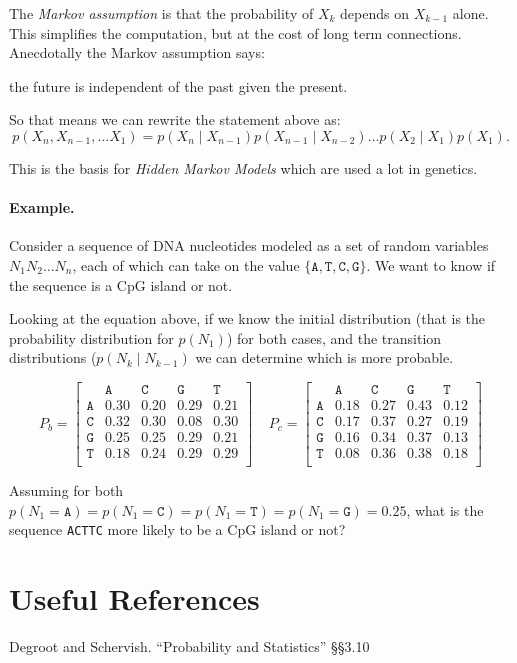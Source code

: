 The \emph{Markov assumption} is that the probability of $X_k$ depends on $X_{k-1}$ alone. 
This simplifies the computation, but at the cost of long term connections. 
Anecdotally the Markov assumption says: 
\begin{center}
the future is independent of the past given the present. 
\end{center}
So that means we can rewrite the statement above as: 
\[p(X_n,X_{n-1},...X_1) = p(X_n \mid X_{n-1}) p(X_{n-1} \mid X_{n-2}) \hdots p(X_2 \mid X_1) p(X_1).\]

This is the basis for \emph{Hidden Markov Models} which are used a lot in genetics. 

\paragraph{Example.} 
Consider a sequence of DNA nucleotides modeled as a set of random variables $N_1N_2\hdots N_n$,
each of which can take on the value $\{\texttt{A},\texttt{T},\texttt{C},\texttt{G}\}$. 
We want to know if the sequence is a CpG island or not. 

Looking at the equation above, if we know the initial distribution (that is the probability distribution for $p(N_1)$) for both cases,
and the transition distributions ($p(N_k\mid N_{k-1})$ we can determine which is more probable. 

\[
P_b = 
\begin{bmatrix}
 & \texttt{A} & \texttt{C} & \texttt{G} & \texttt{T}\\
 \texttt{A} & 0.30 & 0.20& 0.29& 0.21\\
 \texttt{C} & 0.32& 0.30& 0.08& 0.30\\
 \texttt{G} & 0.25 & 0.25 & 0.29 & 0.21\\
 \texttt{T} & 0.18 & 0.24 & 0.29 & 0.29\\
\end{bmatrix} \;\;\;\;
P_c = 
\begin{bmatrix}
 & \texttt{A} & \texttt{C} & \texttt{G} & \texttt{T}\\
 \texttt{A} & 0.18 & 0.27 & 0.43 & 0.12\\ 
 \texttt{C} & 0.17 & 0.37 & 0.27 & 0.19\\
 \texttt{G} & 0.16 & 0.34 & 0.37 & 0.13\\
 \texttt{T} & 0.08 & 0.36 & 0.38 & 0.18\\
\end{bmatrix}
\]

Assuming for both $p(N_1=\texttt{A}) = p(N_1=\texttt{C}) = p(N_1=\texttt{T}) = p(N_1=\texttt{G}) = 0.25$, 
what is the sequence \texttt{ACTTC} more likely to be a CpG island or not?


\section*{Useful References}
Degroot and Schervish. ``Probability and Statistics''  \S\S3.10

